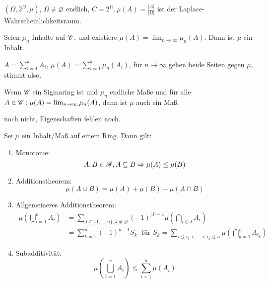 		\begin{bsp}
			$(\Omega, 2^\Omega, \mu)$, $\Omega\neq\varnothing$ endlich, $C=2^\Omega, \mu(A)=\frac{|A|}{|\Omega|}$ ist der Laplace-Wahrscheinlichkeitsraum.
		\end{bsp}
		\begin{satz}
			Seien $\mu_n$ Inhalte auf $\mathscr{C}$, und existiere $\mu(A)=\lim_{n\to\infty} \mu_n(A)$. Dann ist $\mu$ ein Inhalt. 
		\end{satz}
		\begin{bew}
			$A=\sum_{i=1}^k A_i$, $\mu(A)=\sum_{i=1}^k \mu_n(A_i)$, für $n\to\infty$ gehen beide Seiten gegen $\mu$, stimmt also. 
		\end{bew}
		\begin{satz}
			Wenn $\mathscr{C}$ ein Sigmaring ist und $\mu_n$ endliche Maße und für alle $A\in\mathscr{C}: \mu(A)=\lim_{n\to\infty} \mu_n(A)$, dann ist $\mu$ auch ein Maß. 
		\end{satz}
		\begin{bew}
			noch nicht, Eigenschaften fehlen noch. 
		\end{bew}
		\begin{satz}
			Sei $\mu$ ein Inhalt/Maß auf einem Ring. Dann gilt:
			\begin{enumerate}
				\item Monotonie: 
				\[ A,B\in\mathscr{R}, A\subseteq B\Rightarrow \mu(A)\le \mu(B) \]
				\item Additionstheorem:
				\[ \mu(A\cup B)=\mu(A)+\mu(B)-\mu(A\cap B) \]
				\item Allgemeineres Additionstheorem:
				\begin{align*}
				\mu\left(\bigcup_{i=1}^n A_i\right)&=\sum_{J\subseteq\{1,...,n\}, J\neq \varnothing} (-1)^{|J|-1}\mu\left(\bigcap_{i\in J} A_i\right)\\
				&=\sum_{k=1}^n (-1)^{k-1} S_k \:\:\:\text{für } S_k=\sum_{i\le i_1<...<i_k\le n} \mu\left(\bigcap_{k=1}^n A_{i_k}\right)
				\end{align*}
				\item Subadditivität:
				\[ \mu\left(\bigcup_{i=1}^n A_i\right)\le \sum_{i=1}^n \mu(A_i) \]
			\end{enumerate}
			
		\end{satz}
